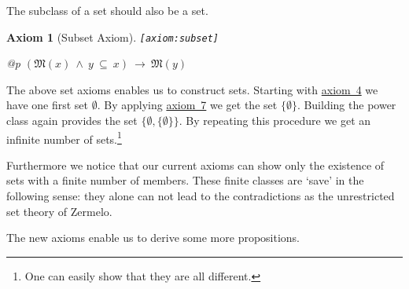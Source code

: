 \documentclass[a4paper,german,10pt,twoside]{book}
\newtheorem{ax}{Axiom}
\theoremstyle{definition}
\theoremstyle{remark}
\begin{document}
\par
The subclass of a set should also be a set.

\begin{ax}[Subset Axiom]
\label{axiom:subset} \hypertarget{axiom:subset}{}
{\tt \tiny [\verb]axiom:subset]]}
\mbox{}
\begin{longtable}{{@{\extracolsep{\fill}}p{\linewidth}}}
\centering $(\mathfrak{M}(x)\ \land\ y \ \subseteq \ x)\ \rightarrow\ \mathfrak{M}(y)$
\end{longtable}

\end{ax}


The above set axioms enables us to construct sets. Starting with 
\hyperlink{axiom:emptySet}{axiom~4} we have one first set $\emptyset$. By applying
\hyperlink{axiom:powerSet}{axiom~7} we get the set $\{ \emptyset \}$. Building the
power class again provides the set $\{ \emptyset, \{ \emptyset \} \}$. 
By repeating this procedure we get an infinite number of 
sets.\footnote{One can easily show that they are all different.}

\par
Furthermore we notice that our current axioms can show only the existence of
sets with a finite number of members. These finite classes are `save' in
the following sense: they alone can not lead to the contradictions as the 
unrestricted set theory of Zermelo.


\par
The new axioms enable us to derive some more propositions.
\end{document}

